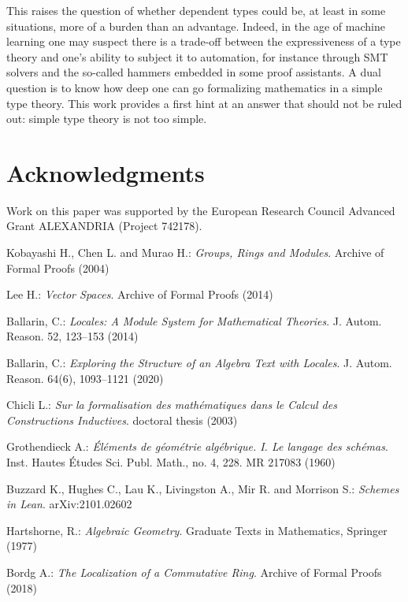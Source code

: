 \documentclass[12pt]{scrartcl}
\begin{document}
This raises the question of whether dependent types could be, at least in some situations, more of a burden than an advantage. Indeed, in the age of machine learning one may suspect there is a trade-off between the expressiveness of a type theory and one's ability to subject it to automation, for instance through SMT solvers and the so-called hammers embedded in some proof assistants. A dual question is to know how deep one can go formalizing mathematics in a simple type theory. This work provides a first hint at an answer that should not be ruled out: simple type theory is not too simple.       

\section*{Acknowledgments}

Work on this paper was supported by the European Research Council Advanced Grant ALEXANDRIA (Project 742178).  			


\begin{thebibliography}{}
	
	Kobayashi H., Chen L. and Murao H.:
	\newblock \textit{Groups, Rings and Modules}.
	\newblock Archive of Formal Proofs (2004)
	
	Lee H.:
	\newblock \textit{Vector Spaces}.
	\newblock Archive of Formal Proofs (2014)
	
	Ballarin, C.: 
	\newblock \textit{Locales: A Module System for Mathematical Theories}.
	\newblock J. Autom. Reason. 52, 123–153 (2014)
	
	Ballarin, C.:
	\newblock \textit{Exploring the Structure of an Algebra Text with Locales}. 
	\newblock J. Autom. Reason. 64(6), 1093–1121 (2020)
	
	Chicli L.:
	\newblock \textit{Sur la formalisation des math\'ematiques dans le Calcul des Constructions Inductives}.
	\newblock doctoral thesis (2003)
	
	Grothendieck A.:
	\newblock \textit{\'El\'ements de g\'eom\'etrie alg\'ebrique. I. Le langage des sch\'emas}.
	\newblock Inst. Hautes \'Etudes Sci. Publ. Math., no. 4, 228. MR 217083 (1960)
	
	Buzzard K., Hughes C., Lau K., Livingston A., Mir R. and Morrison S.:
	\newblock \textit{Schemes in Lean}.
	\newblock arXiv:2101.02602
	
	Hartshorne, R.:
	\newblock \textit{Algebraic Geometry}.
	\newblock Graduate Texts in Mathematics, Springer (1977)
	
	Bordg A.:
	\newblock \textit{The Localization of a Commutative Ring}.
	\newblock Archive of Formal Proofs (2018)
	
\end{thebibliography}

					

		
\end{document}
